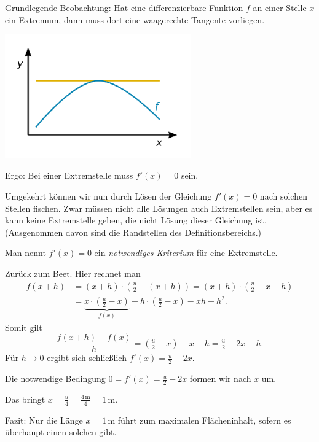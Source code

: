 \documentclass{beamer}
\newcommand{\unit}[1]{\mathrm{#1}}
\begin{document}
\begin{frame}[t]
\vspace{1em}
Grundlegende Beobachtung: Hat eine differenzierbare Funktion $f$ an
einer Stelle $x$ ein Extremum, dann muss dort eine waagerechte
Tangente vorliegen.
\pause

\vspace{-1em}
\begin{center}
\includegraphics[width=80mm]{img/Maximum.pdf}
\end{center}
\end{frame}

\begin{frame}
Ergo: Bei einer Extremstelle muss $f'(x)=0$ sein.
\pause

\vspace{0.8em}
Umgekehrt können wir nun durch Lösen der Gleichung $f'(x)=0$ nach
solchen Stellen fischen. Zwar müssen nicht alle Lösungen auch
Extremstellen sein, aber es kann keine Extremstelle geben, die nicht
Lösung dieser Gleichung ist. {\footnotesize
(Ausgenommen davon sind die Randstellen des Definitionsbereichs.)}
\pause

\vspace{0.8em}
Man nennt $f'(x)=0$ ein \emph{notwendiges Kriterium} für eine
Extremstelle.
\end{frame}

\begin{frame}
Zurück zum Beet.\pause{} Hier rechnet man
\begin{align*}f(x+h) &= (x+h)\cdot(\tfrac{u}{2}-(x+h)) = (x+h)\cdot(\tfrac{u}{2}-x-h)\\
&= \underbrace{x\cdot(\tfrac{u}{2}-x)}_{f(x)} + h\cdot (\tfrac{u}{2}-x) - xh - h^2.
\end{align*}\pause
Somit gilt
\[\frac{f(x+h)-f(x)}{h} = (\tfrac{u}{2}-x) - x - h = \tfrac{u}{2}-2x-h.
\]\pause
Für $h\to 0$ ergibt sich schließlich $f'(x) = \tfrac{u}{2}-2x$.
\end{frame}

\begin{frame}
Die notwendige Bedingung $0=f'(x)=\tfrac{u}{2}-2x$ formen wir nach
$x$ um.\pause

\vspace{0.8em}
Das bringt $x = \tfrac{u}{4} = \tfrac{4\,\unit{m}}{4} = 1\,\unit{m}$.
\pause

\vspace{0.8em}
Fazit: Nur die Länge $x = 1\,\unit{m}$ führt zum maximalen
Flächeninhalt, sofern es überhaupt einen solchen gibt.
\end{frame}
\end{document}

